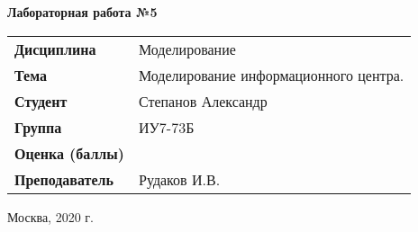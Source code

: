 \begin{center}
    \textbf{Лабораторная работа №5} \\
    \vspace{0.5cm}
\end{center}

\vspace{4cm}

\begin{flushleft}
    \begin{tabular}{ll}
        \textbf{Дисциплина} & Моделирование \\
        \textbf{Тема} & Моделирование информационного центра. \\
        \textbf{Студент} & Степанов Александр \\
        \textbf{Группа} & ИУ7-73Б \\
        \textbf{Оценка (баллы)} & \\
        \textbf{Преподаватель} & Рудаков И.В. \\
    \end{tabular}
\end{flushleft}

\vspace{4cm}

\begin{center}
    Москва, 2020 г.
\end{center}
